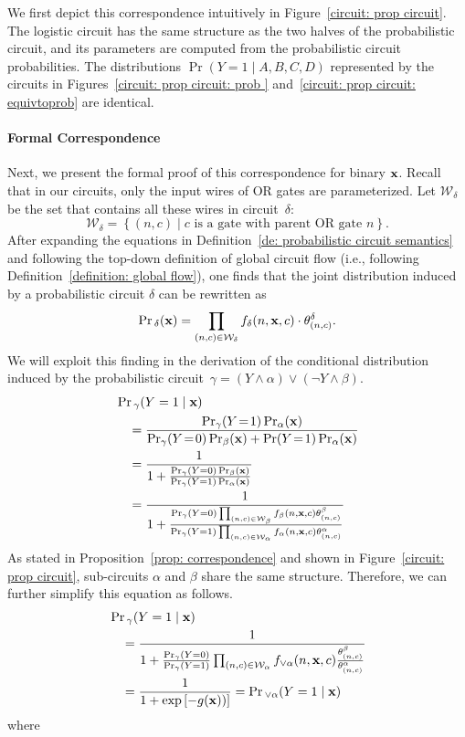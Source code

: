 \documentclass[letterpaper]{article} %
\newcommand{\sample}{{\bf x}}
\begin{document}
We first depict this correspondence intuitively in Figure~\ref{circuit: prop circuit}. The logistic circuit has the same structure as the two halves of the probabilistic circuit, and its parameters are computed from the probabilistic circuit probabilities. The distributions $\Pr(Y=1 \mid A,B,C,D)$ represented by the circuits in Figures~\ref{circuit: prop circuit: prob } and~\ref{circuit: prop circuit: equivtoprob} are identical.

\paragraph{Formal Correspondence}
Next, we present the formal proof of this correspondence for binary $\sample$.
Recall that in our circuits, only the input wires of OR gates are parameterized. Let $\mathcal{W}_\delta$ be the set that contains all these wires in circuit~$\delta$: $$\mathcal{W}_\delta = \left\{(n, c) \mid c\text{ is a gate with parent OR gate } n \right\}.$$
After expanding the equations in Definition~\ref{de: probabilistic circuit semantics} and following the top-down definition of global circuit flow (i.e., following Definition~\ref{definition: global flow}), one finds that the joint distribution induced by a probabilistic circuit $\delta$ can be rewritten as
$$
\Pr{_\delta}(\sample) = \prod_{(n, c) \in \mathcal{W}_\delta} f_\delta(n,\sample,c) \cdot \theta_{(n,c)}^\delta.
$$
We will exploit this finding in the derivation of the conditional distribution induced by the probabilistic circuit~$\gamma = (Y \land \alpha) \lor (\neg Y \land \beta)$.
\begin{align}
&\Pr{_{\gamma}}(Y=1 \mid \sample) \nonumber \\
&\quad =\frac{\Pr_\gamma(Y\!=\!1)\Pr_\alpha(\sample)}{\Pr_\gamma(Y\!=\!0)\Pr_\beta(\sample) + \Pr(Y\!=\!1)\Pr_\alpha(\sample)} \nonumber\\
&\quad = \frac{1}{1+\frac{\Pr_{\gamma}(Y=0)\Pr_\beta(\sample)}{\Pr_{\gamma}(Y=1)\Pr_\alpha(\sample)}} \nonumber \\
&\quad =\frac{1}{1+\frac{\Pr_{\gamma}(Y=0)\prod_{(n,c) \in \mathcal{W}_\beta} f_\beta(n,\sample,c)\theta_{(n,c)}^\beta}{\Pr_{\gamma}(Y=1)\prod_{(n,c) \in \mathcal{W}_\alpha} f_\alpha(n,\sample,c)\theta^\alpha_{(n,c)}}} \nonumber
\end{align}  As stated in Proposition~\ref{prop: correspondence} and shown in Figure~\ref{circuit: prop circuit}, sub-circuits $\alpha$ and $\beta$ share the same structure. Therefore, we can further simplify this equation as follows.
\begin{align}
&\Pr{_{\gamma}}(Y=1 \mid \sample) \nonumber \\
&\quad = \frac{1}{1+\frac{\Pr_{\gamma}(Y=0)}{\Pr_{\gamma}(Y=1)}\prod_{(n,c) \in \mathcal{W}_{\alpha} } f_{\lor \alpha}(n, \sample, c) \frac{\theta^\beta_{(n,c)}}{\theta^\alpha_{(n,c)}} }  \nonumber
\\
&\quad = \frac{1}{1+\exp\left[- g(\sample)) \right]} = \Pr{_{\lor \alpha}}(Y=1 \mid \sample) \nonumber
\end{align}  where
\end{document}
